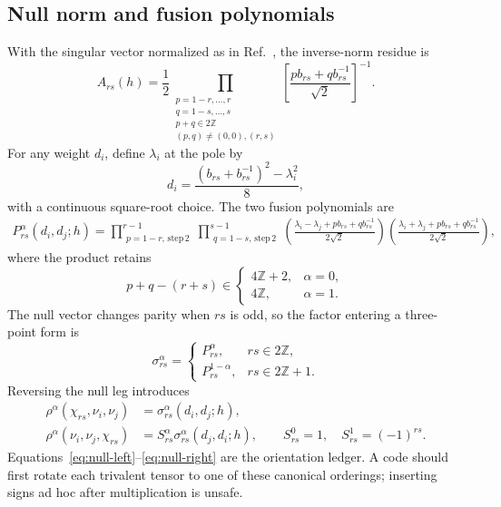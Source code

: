 \documentclass[11pt]{article}
\begin{document}
\subsection{Null norm and fusion polynomials}

With the singular vector normalized as in
Ref.~\cite{BelavinGeiko2018CRecursion}, the inverse-norm residue is
\begin{equation}
 A_{rs}(h)=\frac12
 \prod_{\substack{p=1-r,\ldots,r\\q=1-s,\ldots,s\\
                   p+q\in2\mathbb Z\\(p,q)\ne(0,0),(r,s)}}
 \left[\frac{pb_{rs}+qb_{rs}^{-1}}{\sqrt2}\right]^{-1}.
 \label{eq:a-rs}
\end{equation}
For any weight $d_i$, define $\lambda_i$ at the pole by
\begin{equation}
 d_i=\frac{(b_{rs}+b_{rs}^{-1})^2-\lambda_i^2}{8},
 \label{eq:lambda-i}
\end{equation}
with a continuous square-root choice.  The two fusion polynomials are
\begin{multline}
 P_{rs}^{\alpha}(d_i,d_j;h)
 =\prod_{\substack{p=1-r,\,\mathrm{step}\,2}}^{r-1}
  \prod_{\substack{q=1-s,\,\mathrm{step}\,2}}^{s-1}
 \left(\frac{\lambda_i-\lambda_j+pb_{rs}+qb_{rs}^{-1}}
 {2\sqrt2}\right)
 \left(\frac{\lambda_i+\lambda_j+pb_{rs}+qb_{rs}^{-1}}
 {2\sqrt2}\right),
 \label{eq:fusion-polynomial}
\end{multline}
where the product retains
\begin{equation}
 p+q-(r+s)\in
 \begin{cases}
 4\mathbb Z+2,&\alpha=0,\\
 4\mathbb Z,&\alpha=1.
 \end{cases}
 \label{eq:fusion-selection}
\end{equation}
The null vector changes parity when $rs$ is odd, so the factor entering a
three-point form is
\begin{equation}
 \sigma_{rs}^{\alpha}=
 \begin{cases}
 P_{rs}^{\alpha},&rs\in2\mathbb Z,\\
 P_{rs}^{1-\alpha},&rs\in2\mathbb Z+1.
 \end{cases}
 \label{eq:sigma}
\end{equation}
Reversing the null leg introduces
\begin{align}
 \rho^{\alpha}(\chi_{rs},\nu_i,\nu_j)
 &=\sigma_{rs}^{\alpha}(d_i,d_j;h),
 \label{eq:null-left}\\
 \rho^{\alpha}(\nu_i,\nu_j,\chi_{rs})
 &=S_{rs}^{\alpha}\sigma_{rs}^{\alpha}(d_j,d_i;h),
 \qquad
 S_{rs}^{0}=1,
 \quad S_{rs}^{1}=(-1)^{rs}.
 \label{eq:null-right}
\end{align}
Equations~\eqref{eq:null-left}--\eqref{eq:null-right} are the orientation
ledger.  A code should first rotate each trivalent tensor to one of these
canonical orderings; inserting signs ad hoc after multiplication is unsafe.
\end{document}
